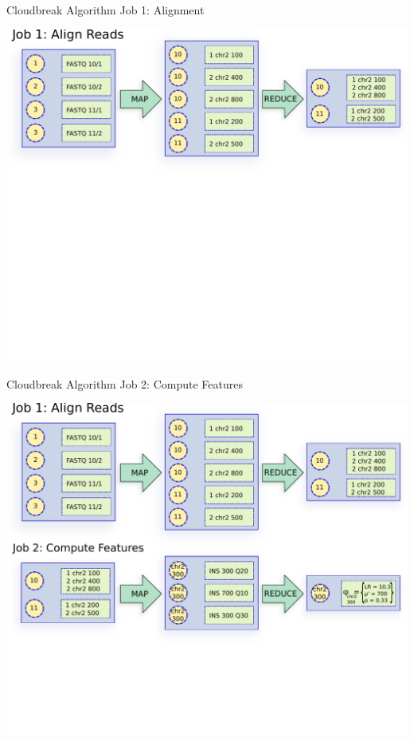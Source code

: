 \documentclass{beamer}
\begin{document}
\begin{frame}{Cloudbreak Algorithm Job 1: Alignment}
  \begin{center}   
    \includegraphics[width=\textwidth,height=0.8\textheight,keepaspectratio]{cloudbreak_mapred_diagram_build_1.pdf}
  \end{center}
\end{frame}


\begin{frame}{Cloudbreak Algorithm Job 2: Compute Features}
  \begin{center}   
    \includegraphics[width=\textwidth,height=0.8\textheight,keepaspectratio]{cloudbreak_mapred_diagram_build_2.pdf}
  \end{center}
\end{frame}
\end{document}
